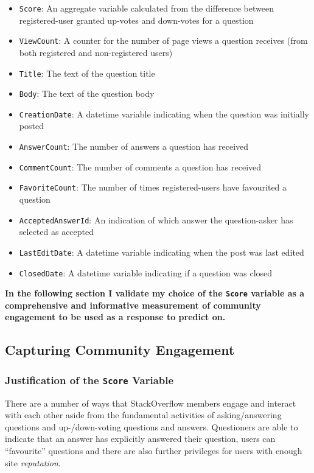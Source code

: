 \documentclass[11pt,preprint, authoryear]{article}
\numberwithin{equation}{section}
\begin{document}
\begin{itemize}
\item
  \texttt{Score}: An aggregate variable calculated from the difference
  between registered-user granted up-votes and down-votes for a question
\item
  \texttt{ViewCount}: A counter for the number of page views a question
  receives (from both registered and non-registered users)
\item
  \texttt{Title}: The text of the question title
\item
  \texttt{Body}: The text of the question body
\item
  \texttt{CreationDate}: A datetime variable indicating when the
  question was initially posted
\item
  \texttt{AnswerCount}: The number of answers a question has received
\item
  \texttt{CommentCount}: The number of comments a question has received
\item
  \texttt{FavoriteCount}: The number of times registered-users have
  favourited a question
\item
  \texttt{AcceptedAnswerId}: An indication of which answer the
  question-asker has selected as accepted
\item
  \texttt{LastEditDate}: A datetime variable indicating when the post
  was last edited
\item
  \texttt{ClosedDate}: A datetime variable indicating if a question was
  closed
\end{itemize}


\textbf{In the following section I validate my choice of the
\texttt{Score} variable as a comprehensive and informative measurement
of community engagement to be used as a response to predict on.}

\subsection{Capturing Community
Engagement}\label{capturing-community-engagement}

\subsubsection{\texorpdfstring{Justification of the \texttt{Score}
Variable
\label{Vars}}{Justification of the Score Variable }}\label{justification-of-the-score-variable}

There are a number of ways that StackOverflow members engage and
interact with each other aside from the fundamental activities of
asking/answering questions and up-/down-voting questions and answers.
Questioners are able to indicate that an answer has explicitly answered
their question, users can ``favourite'' questions and there are also
further privileges for users with enough site \emph{reputation}.
\end{document}
